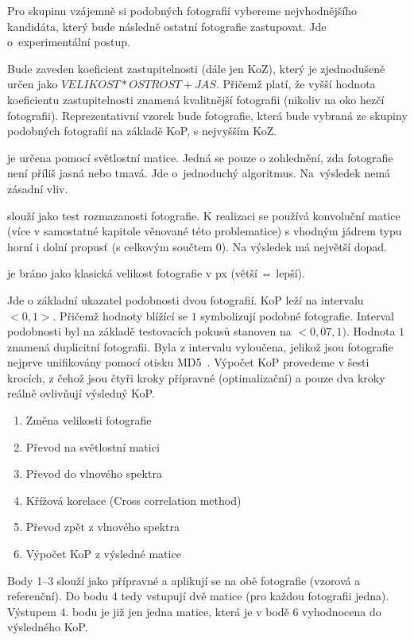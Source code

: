 Pro skupinu vzájemně si podobných fotografií vybereme nejvhodnějšího kandidáta, který bude následně ostatní fotografie zastupovat. Jde o~experimentální postup.

Bude zaveden koeficient zastupitelnosti (dále jen KoZ), který je zjednodušeně určen jako $ VELIKOST * OSTROST + JAS $. Přičemž platí, že vyšší hodnota koeficientu zastupitelnosti znamená kvalitnější fotografii (nikoliv na oko hezčí fotografii). Reprezentativní vzorek bude fotografie, která bude vybraná ze skupiny podobných fotografií na základě KoP, s nejvyšším KoZ.


je určena pomocí světlostní matice. Jedná se pouze o zohlednění, zda fotografie není příliš jasná nebo tmavá. Jde o~jednoduchý algoritmus. Na~výsledek nemá zásadní vliv.

slouží jako test rozmazanosti fotografie. K realizaci se používá konvoluční matice (více v samostatné kapitole věnované této problematice) s vhodným jádrem typu horní i dolní propusť (s celkovým součtem 0). Na výsledek má největší dopad.

je bráno jako klasická velikost fotografie v px (větší ⇔ lepší).

Jde o základní ukazatel podobnosti dvou fotografií. KoP leží na intervalu $ <0,1> $. Přičemž hodnoty blížící se $ 1 $ symbolizují podobné fotografie. Interval podobnosti byl na základě testovacích pokusů stanoven na $ <0,07, 1) $. Hodnota $ 1 $ znamená duplicitní fotografii. Byla z intervalu vyloučena, jelikož jsou fotografie nejprve unifikovány pomocí otisku MD5~\cite{md5}.
Výpočet KoP provedeme v šesti krocích, z čehož jsou čtyři kroky přípravné (optimalizační) a pouze dva kroky reálně ovlivňují výsledný KoP.
\begin{enumerate}
	\setlength{\parskip}{0pt}
	\setlength{\itemsep}{0pt}
	\item {Změna velikosti fotografie}
	\item {Převod na světlostní matici}
	\item {Převod do vlnového spektra}
	\item {Křížová korelace (Cross correlation method)}
	\item {Převod zpět z vlnového spektra}
	\item {Výpočet KoP z výsledné matice}
\end{enumerate}
Body 1--3 slouží jako přípravné a aplikují se na obě fotografie (vzorová a referenční). Do bodu 4 tedy vstupují dvě matice (pro každou fotografii jedna). Výstupem 4. bodu je již jen jedna matice, která je v bodě 6 vyhodnocena do výsledného KoP.

